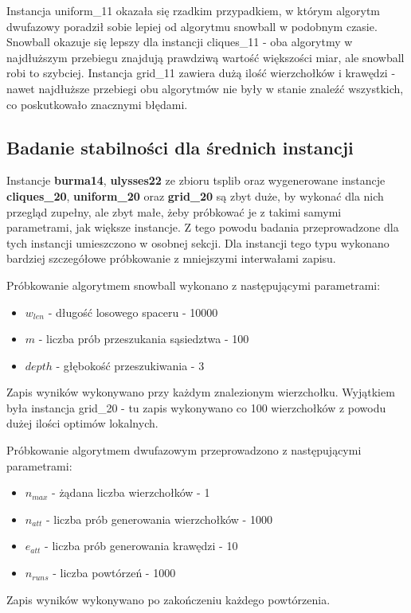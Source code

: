 Instancja uniform\_11 okazała się rzadkim przypadkiem, w którym algorytm dwufazowy poradził sobie lepiej od algorytmu snowball w podobnym czasie.
Snowball okazuje się lepszy dla instancji cliques\_11 - oba algorytmy w najdłuższym przebiegu znajdują prawdziwą wartość większości miar, ale snowball robi to szybciej.
Instancja grid\_11 zawiera dużą ilość wierzchołków i krawędzi - nawet najdłuższe przebiegi obu algorytmów nie były w stanie znaleźć wszystkich,
co poskutkowało znacznymi błędami.

\subsection{Badanie stabilności dla średnich instancji}
Instancje \textbf{burma14}, \textbf{ulysses22} ze zbioru tsplib oraz wygenerowane instancje
\textbf{cliques\_20}, \textbf{uniform\_20} oraz \textbf{grid\_20} są zbyt duże, by wykonać dla nich przegląd zupełny,
ale zbyt małe, żeby próbkować je z takimi samymi parametrami, jak większe instancje.
Z tego powodu badania przeprowadzone dla tych instancji umieszczono w osobnej sekcji.
Dla instancji tego typu wykonano bardziej szczegółowe próbkowanie z mniejszymi interwałami zapisu.

Próbkowanie algorytmem snowball wykonano z następującymi parametrami:
\begin{itemize}
    \item $w_{len}$ - długość losowego spaceru - 10000
    \item $m$ - liczba prób przeszukania sąsiedztwa - 100
    \item $depth$ - głębokość przeszukiwania - 3
\end{itemize}
Zapis wyników wykonywano przy każdym znalezionym wierzchołku.
Wyjątkiem była instancja grid\_20 - tu zapis wykonywano co 100 wierzchołków z powodu dużej ilości optimów lokalnych.

Próbkowanie algorytmem dwufazowym przeprowadzono z następującymi parametrami:
\begin{itemize}
    \item $n_{max}$ - żądana liczba wierzchołków - 1
    \item $n_{att}$ - liczba prób generowania wierzchołków - 1000
    \item $e_{att}$ - liczba prób generowania krawędzi - 10
    \item $n_{runs}$ - liczba powtórzeń - 1000
\end{itemize}
Zapis wyników wykonywano po zakończeniu każdego powtórzenia.

